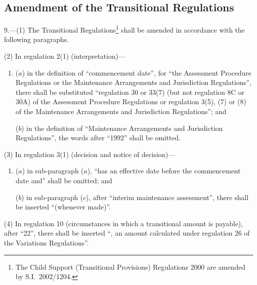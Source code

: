 \documentclass[12pt,a4paper]{article}
\begin{document}
\subsection[9. Amendment of the Transitional Regulations]{Amendment of the Transitional Regulations}

9.---(1)  The Transitional Regulations\footnote{The Child Support (Transitional Provisions) Regulations 2000 are amended by S.I.\ 2002/1204.} shall be amended in accordance with the following paragraphs.

(2) In regulation 2(1) (interpretation)—
\begin{enumerate}\item[]
($a$) in the definition of “commencement date”, for “the Assessment Procedure Regulations or the Maintenance Arrangements and Jurisdiction Regulations”, there shall be substituted “regulation 30 or 33(7) (but not regulation 8C or 30A) of the Assessment Procedure Regulations or regulation 3(5), (7) or (8) of the Maintenance Arrangements and Jurisdiction Regulations”; and

($b$) in the definition of “Maintenance Arrangements and Jurisdiction Regulations”, the words after “1992” shall be omitted.
\end{enumerate}

(3) In regulation 3(1) (decision and notice of decision)—
\begin{enumerate}\item[]
($a$) in sub-paragraph ($a$), “has an effective date before the commencement date and” shall be omitted; and

($b$) in sub-paragraph ($c$), after “interim maintenance assessment”, there shall be inserted “(whenever made)”.
\end{enumerate}

(4) In regulation 10 (circumstances in which a transitional amount is payable), after “22”, there shall be inserted “, an amount calculated under regulation 26 of the Variations Regulations”.
\end{document}
